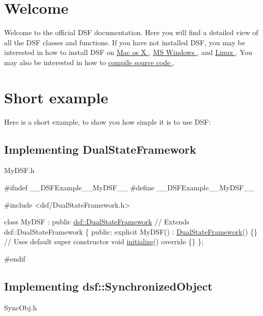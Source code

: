\hypertarget{index_welcome}{}\section{Welcome}\label{index_welcome}
Welcome to the official D\+S\+F documentation. Here you will find a detailed view of all the D\+S\+F classes and functions. If you have not installed D\+S\+F, you may be interested in how to install D\+S\+F on \hyperlink{_mac}{Mac os X }, \hyperlink{_win}{M\+S Windows }, and \hyperlink{_linux}{Linux }. You may also be interested in how to \hyperlink{source}{compile source code }.\hypertarget{index_example}{}\section{Short example}\label{index_example}
Here is a short example, to show you how simple it is to use D\+S\+F\+: \hypertarget{index_dsf}{}\subsection{Implementing Dual\+State\+Framework}\label{index_dsf}
My\+D\+S\+F.\+h 
\begin{DoxyCodeInclude}
\textcolor{preprocessor}{#ifndef \_\_DSFExample\_\_MyDSF\_\_}
\textcolor{preprocessor}{#define \_\_DSFExample\_\_MyDSF\_\_}

\textcolor{preprocessor}{#include <dsf/DualStateFramework.h>}

\textcolor{keyword}{class }MyDSF : \textcolor{keyword}{public} \hyperlink{classdsf_1_1_dual_state_framework}{dsf::DualStateFramework} \textcolor{comment}{// Extends dsf::DualStateFramework}
\{
\textcolor{keyword}{public}:
    \textcolor{keyword}{explicit} MyDSF() : \hyperlink{namespacedsf_a68ac3b6a0526bfa7f6a412918afb1841}{DualStateFramework}() \{\} \textcolor{comment}{// Uses default super constructor}
    \textcolor{keywordtype}{void} \hyperlink{classdsf_1_1_dual_state_framework_a809a7bba4148e17ea9a43a0a035383ba}{initialize}()\textcolor{keyword}{ override }\{\}
\};

\textcolor{preprocessor}{#endif}
\end{DoxyCodeInclude}
\hypertarget{index_syncObj}{}\subsection{Implementing dsf\+::\+Synchronized\+Object}\label{index_syncObj}
Sync\+Obj.\+h 
